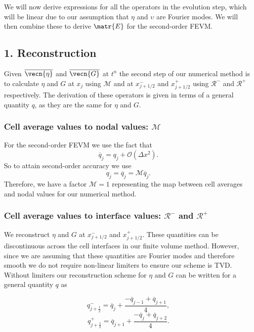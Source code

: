 We will now derive expressions for all the operators in the evolution step, which will be linear due to our assumption that $\eta$ and $\upsilon$ are Fourier modes. We will then combine these to derive $\matr{E}$ for the second-order FEVM.

\subsection{1. Reconstruction}
Given $\overline{\vecn{\eta}}$ and $\overline{\vecn{G}}$ at $t^n$ the second step of our numerical method is to calculate $\eta$ and $G$ at $x_j$ using $\mathcal{M}$ and at $x^-_{j+1/2}$ and $x^+_{j+1/2}$ using $\mathcal{R}^-$ and $\mathcal{R}^+$ respectively. The derivation of these operators is given in terms of a general quantity $q$, as they are the same for $\eta$ and $G$.
\subsubsection{Cell average values to nodal values: $\mathcal{M}$}
For the second-order FEVM we use the fact that
\begin{equation*}
\overline{q}_j =q_j  + \mathcal{O}\left(\Delta x^2\right).
\end{equation*}
%
So to attain second-order accuracy we use
%
\begin{equation}
\label{eqn:Mfactorfourier}
q_j = \overline{q}_j  = \mathcal{M} \overline{q}_j.
\end{equation}
Therefore, we have a factor $\mathcal{M}=1$ representing the map between cell averages and nodal values for our numerical method.

\subsubsection{Cell average values to interface values: $\mathcal{R}^-$ and $\mathcal{R}^+$}

We reconstruct $\eta$ and $G$ at $x^-_{j+1/2}$ and $x^+_{j+1/2}$. These quantities can be discontinuous across the cell interfaces in our finite volume method. However, since we are assuming that these quantities are Fourier modes and therefore smooth we do not require non-linear limiters to ensure our scheme is TVD. Without limiters our reconstruction scheme for $\eta$ and $G$ can be written for a general quantity $q$ as

\begin{equation*}
q^-_{j+\frac{1}{2}} = \overline{q}_j + \frac{- \overline{q}_{j - 1} + \overline{q}_{j+ 1} }{4},
\end{equation*}
\begin{equation*}
q^+_{j+\frac{1}{2}} = \overline{q}_{j+1} + \frac{- \overline{q}_{j} + \overline{q}_{j+ 2}}{4}.
\end{equation*}

